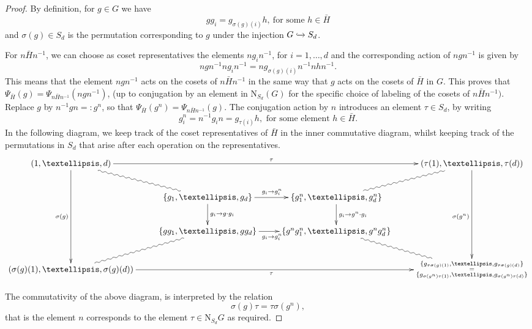 \documentclass[10pt,a4paper]{amsart}
\begin{document}
\begin{proof} By definition, for $g\in G$ we have 
\[
  g g_i =g_{\sigma(g)(i)} h, \ \text{for some } h \in \bar{H}
\]
and $\sigma(g)\in S_d$ is the permutation corresponding to $g$ under the injection $G\xhookrightarrow{}S_d$. 

For $n\bar{H}n^{-1}$, we can choose as coset representatives the elements
$n g_i n^{-1}$, for $i=1,\ldots,d$
 and the corresponding action of $ngn^{-1}$ is given by
\[
  n g  n^{-1} ng_in^{-1}  = n g_{\sigma(g)(i)} n^{-1} nhn^{-1}.
\]
This means that the element $ngn^{-1}$ acts on the cosets of $n\bar{H}n^{-1}$ in the same way that $ g $ acts on the cosets of $\bar{H}$ in $G$. This proves that $\Psi_{\bar H} (g) = \Psi_{n\bar H n^{-1}} (ngn^{-1})$, (up to conjugation by an element in $\mathrm{N}_{S_d}(G)$ for the specific choice of labeling of the cosets of $n\bar{H}n^{-1})$. Replace $g$ by $n^{-1}gn =\colon g^n $, so that $\Psi_{\bar H} (g^n) = \Psi_{n\bar H n^{-1}} (g)$.
The conjugation action by $n$ introduces an element $\tau\in S_d$, by writing
\[
  g_i^n = n^{-1}g_i n = g_{\tau(i)} h, \text{ for some element } h \in \bar{H}. 
\]
In the following diagram, we keep track of the coset representatives of $\bar{H}$ in the inner commutative diagram, whilst keeping track of the permutations in $S_d$ that arise after each operation on the representatives.
{\tiny
\[
\xymatrix{
  (1,\ldots,d) \ar[rrr]^{\tau}
    \ar[ddd]_{\sigma(g)} \ar@{~}[dr]  & & & (\tau(1),\ldots,\tau(d)) \ar[ddd]_{  \sigma(g^n) }
    \\
   &     \{g_1,\ldots,g_d\} 
  \ar[d]^{g_i \rightarrow g\cdot g_i}
  \ar[r]^{g_i\rightarrow g_i^n} & \{g_1^n,\ldots,g_d^n\} 
 \ar[d]^{g_i \rightarrow g^n\cdot g_i}
  \ar@{~}[ur] & 
  \\
    &     \{gg_1,\ldots,gg_d\} \ar[r]_{g_i\rightarrow g_i^n} & \{g^ng_1^n,\ldots,g^ng_d^n\} \ar@{~}[dr]
\\
(\sigma(g)(1),\ldots,\sigma(g)(d)) 
   \ar@{~}[ur]
   \ar[rrr]_\tau
& & & 
\substack{
  \{g_{\tau\sigma(g)(1)},\ldots,g_{\tau\sigma(g)(d)}\} \\
  = \\
   \{g_{\sigma(g^n)\tau(1)},\ldots,g_{\sigma(g^n)\tau(d)}\} 
}
}
\]
}

The commutativity of the above diagram, is interpreted by the relation
\[
  \sigma(g)\tau=\tau   \sigma(g^n),
\]
that is the element $n$ corresponds to  the element $\tau \in \mathrm{N}_{S_d}G$ as required.  
\end{proof}
\end{document}
